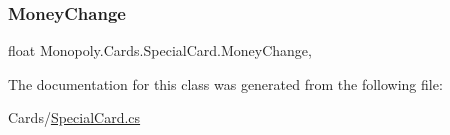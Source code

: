 \mbox{\label{class_monopoly_1_1_cards_1_1_special_card_ab81aa9650e34745aa35b313730a8c0c4}} 
\subsubsection{\texorpdfstring{Money\+Change}{MoneyChange}}
{\footnotesize\ttfamily float Monopoly.\+Cards.\+Special\+Card.\+Money\+Change\hspace{0.3cm}{\ttfamily [get]}, {}}



The documentation for this class was generated from the following file\+:\begin{DoxyCompactItemize}
\item 
Cards/\mbox{\hyperlink{_special_card_8cs}{Special\+Card.\+cs}}\end{DoxyCompactItemize}
